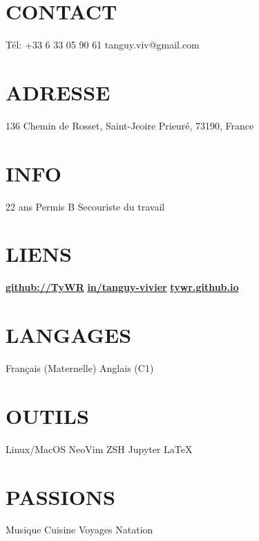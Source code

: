 \documentclass[]{cv-style}          %
\begin{document}
%
\begin{aside}
%
\section{CONTACT} \vspace{0.1cm}
Tél: +33 6 33 05 90 61
tanguy.viv@gmail.com
%
\section{ADRESSE} \vspace{0.1cm}
136 Chemin de Rosset,
Saint-Jeoire Prieuré,
73190,
France
%
\section{INFO} \vspace{0.1cm}
22 ans
Permis B
Secouriste du travail
%
\section{LIENS} \vspace{0.1cm}
\href{https://github.com/TyWR}{\textbf{github://TyWR}}
\href{https://www.linkedin.com/in/tanguy-vivier/}{\textbf{in/tanguy-vivier}}
\href{https://tywr.github.io/}{\textbf{tywr.github.io}}
%
\section{LANGAGES} \vspace{0.1cm}
Français (Maternelle)
Anglais (C1)
%
\section{OUTILS} \vspace{0.1cm}
Linux/MacOS
NeoVim
ZSH
Jupyter
\LaTeX{}
%
\section{PASSIONS} \vspace{0.1cm}
Musique
Cuisine
Voyages
Natation
%
\end{aside}
\end{document}
